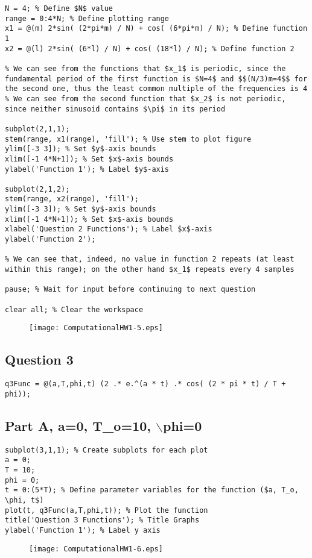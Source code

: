 \documentclass[10pt]{article}
\begin{document}
\begin{lstlisting}
N = 4; % Define $N$ value
range = 0:4*N; % Define plotting range
x1 = @(m) 2*sin( (2*pi*m) / N) + cos( (6*pi*m) / N); % Define function 1
x2 = @(l) 2*sin( (6*l) / N) + cos( (18*l) / N); % Define function 2

% We can see from the functions that $x_1$ is periodic, since the fundamental period of the first function is $N=4$ and $$(N/3)m=4$$ for the second one, thus the least common multiple of the frequencies is 4
% We can see from the second function that $x_2$ is not periodic, since neither sinusoid contains $\pi$ in its period

subplot(2,1,1);
stem(range, x1(range), 'fill'); % Use stem to plot figure
ylim([-3 3]); % Set $y$-axis bounds
xlim([-1 4*N+1]); % Set $x$-axis bounds
ylabel('Function 1'); % Label $y$-axis

subplot(2,1,2);
stem(range, x2(range), 'fill');
ylim([-3 3]); % Set $y$-axis bounds
xlim([-1 4*N+1]); % Set $x$-axis bounds
xlabel('Question 2 Functions'); % Label $x$-axis
ylabel('Function 2');

% We can see that, indeed, no value in function 2 repeats (at least within this range); on the other hand $x_1$ repeats every 4 samples

pause; % Wait for input before continuing to next question

clear all; % Clear the workspace
\end{lstlisting}
\begin{figure}[H]
\texttt{[image: ComputationalHW1-5.eps]}
\end{figure}


{}
\subsection*{Question 3}

\begin{lstlisting}
q3Func = @(a,T,phi,t) (2 .* e.^(a * t) .* cos( (2 * pi * t) / T + phi));
\end{lstlisting}


{}
\subsection*{Part A, a=0, T\_o=10, \ensuremath{\backslash}phi=0}

\begin{lstlisting}
subplot(3,1,1); % Create subplots for each plot
a = 0;
T = 10;
phi = 0;
t = 0:(5*T); % Define parameter variables for the function ($a, T_o, \phi, t$)
plot(t, q3Func(a,T,phi,t)); % Plot the function
title('Question 3 Functions'); % Title Graphs
ylabel('Function 1'); % Label y axis
\end{lstlisting}
\begin{figure}[H]
\texttt{[image: ComputationalHW1-6.eps]}
\end{figure}
\end{document}
